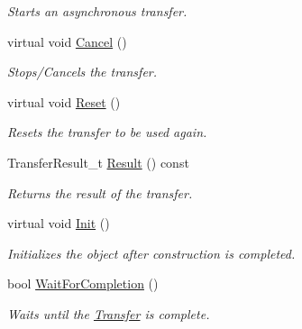 \begin{DoxyCompactItemize}
\begin{DoxyCompactList}\small\item\em Starts an asynchronous transfer. \end{DoxyCompactList}\item 
\hypertarget{class_lib_u_s_b_1_1_transfer_a625044102e97538726eccba59a41f6a6}{virtual void \hyperlink{class_lib_u_s_b_1_1_transfer_a625044102e97538726eccba59a41f6a6}{Cancel} ()}\label{class_lib_u_s_b_1_1_transfer_a625044102e97538726eccba59a41f6a6}

\begin{DoxyCompactList}\small\item\em Stops/\-Cancels the transfer. \end{DoxyCompactList}\item 
\hypertarget{class_lib_u_s_b_1_1_transfer_a2545527a281fb10a8474d46cd4575d42}{virtual void \hyperlink{class_lib_u_s_b_1_1_transfer_a2545527a281fb10a8474d46cd4575d42}{Reset} ()}\label{class_lib_u_s_b_1_1_transfer_a2545527a281fb10a8474d46cd4575d42}

\begin{DoxyCompactList}\small\item\em Resets the transfer to be used again. \end{DoxyCompactList}\item 
\hypertarget{class_lib_u_s_b_1_1_transfer_a499e1d2d8d76ba3a01c16007d5240d32}{Transfer\-Result\-\_\-t \hyperlink{class_lib_u_s_b_1_1_transfer_a499e1d2d8d76ba3a01c16007d5240d32}{Result} () const }\label{class_lib_u_s_b_1_1_transfer_a499e1d2d8d76ba3a01c16007d5240d32}

\begin{DoxyCompactList}\small\item\em Returns the result of the transfer. \end{DoxyCompactList}\item 
\hypertarget{class_lib_u_s_b_1_1_transfer_a0c3819a498e103f14997f1a87f69873d}{virtual void \hyperlink{class_lib_u_s_b_1_1_transfer_a0c3819a498e103f14997f1a87f69873d}{Init} ()}\label{class_lib_u_s_b_1_1_transfer_a0c3819a498e103f14997f1a87f69873d}

\begin{DoxyCompactList}\small\item\em Initializes the object after construction is completed. \end{DoxyCompactList}\item 
\hypertarget{class_lib_u_s_b_1_1_transfer_ac8ac10245a2bdd4c90495de86c7c1480}{bool \hyperlink{class_lib_u_s_b_1_1_transfer_ac8ac10245a2bdd4c90495de86c7c1480}{Wait\-For\-Completion} ()}\label{class_lib_u_s_b_1_1_transfer_ac8ac10245a2bdd4c90495de86c7c1480}

\begin{DoxyCompactList}\small\item\em Waits until the \hyperlink{class_lib_u_s_b_1_1_transfer}{Transfer} is complete. \end{DoxyCompactList}\end{DoxyCompactItemize}
